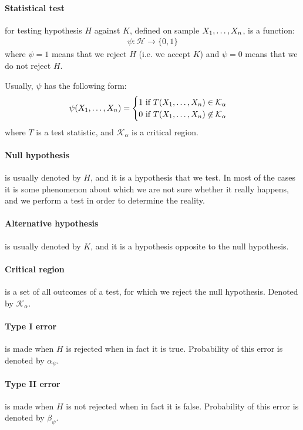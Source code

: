 \paragraph{Statistical test}
for testing hypothesis $H$ against $K$, defined on sample $X_{1}, \ldots, X_{n}$, is a function:
\begin{gather*}
\psi: \mathcal{H} \rightarrow \{0, 1\}
\end{gather*}
where $\psi = 1$ means that we reject $H$ (i.e. we accept $K$) and $\psi = 0$ means that we do not reject $H$.

Usually, $\psi$ has the following form:
\begin{gather*}
\psi(X_{1}, \ldots, X_{n}) = 
\begin{cases}
1 \mbox{ if } T(X_{1}, \ldots, X_{n}) \in \mathcal{K}_\alpha \\
0 \mbox{ if } T(X_{1}, \ldots, X_{n}) \not\in \mathcal{K}_\alpha
\end{cases}
\end{gather*}
where $T$ is a test statistic, and $\mathcal{K}_\alpha$ is a critical region.

\paragraph{Null hypothesis}
is usually denoted by $H$, and it is a hypothesis that we test. In most of the cases it is some
phenomenon about which we are not sure whether it really happens, and we perform a test in order to
determine the reality.

\paragraph{Alternative hypothesis}
is usually denoted by $K$, and it is a hypothesis opposite to the null hypothesis.

\paragraph{Critical region}
is a set of all outcomes of a test, for which we reject the null hypothesis. Denoted by $\mathcal{K}_\alpha$.

\paragraph{Type I error}
is made when $H$ is rejected when in fact it is true. Probability of this error is denoted by $\alpha_\psi$.

\paragraph{Type II error}
is made when $H$ is not rejected when in fact it is false. Probability of this error is denoted by $\beta_\psi$.

